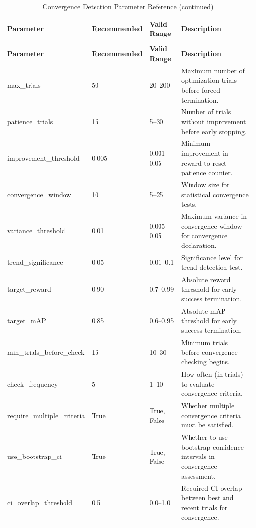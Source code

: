 \begin{longtable}{p{3.5cm}p{2cm}p{2.5cm}p{5.5cm}}
\caption{Convergence Detection Parameter Reference} \label{tab:convergence} \\
\toprule
\textbf{Parameter} & \textbf{Recommended} & \textbf{Valid Range} & \textbf{Description} \\
\midrule
\endfirsthead
\caption[]{Convergence Detection Parameter Reference (continued)} \\
\toprule
\textbf{Parameter} & \textbf{Recommended} & \textbf{Valid Range} & \textbf{Description} \\
\midrule
\endhead
\bottomrule
\endfoot
\bottomrule
\endlastfoot
max\_trials & 50 & 20--200 & Maximum number of optimization trials before forced termination. \\
\addlinespace
patience\_trials & 15 & 5--30 & Number of trials without improvement before early stopping. \\
\addlinespace
improvement\_threshold & 0.005 & 0.001--0.05 & Minimum improvement in reward to reset patience counter. \\
\addlinespace
convergence\_window & 10 & 5--25 & Window size for statistical convergence tests. \\
\addlinespace
variance\_threshold & 0.01 & 0.005--0.05 & Maximum variance in convergence window for convergence declaration. \\
\addlinespace
trend\_significance & 0.05 & 0.01--0.1 & Significance level for trend detection test. \\
\addlinespace
target\_reward & 0.90 & 0.7--0.99 & Absolute reward threshold for early success termination. \\
\addlinespace
target\_mAP & 0.85 & 0.6--0.95 & Absolute mAP threshold for early success termination. \\
\addlinespace
min\_trials\_before\_check & 15 & 10--30 & Minimum trials before convergence checking begins. \\
\addlinespace
check\_frequency & 5 & 1--10 & How often (in trials) to evaluate convergence criteria. \\
\addlinespace
require\_multiple\_criteria & True & True, False & Whether multiple convergence criteria must be satisfied. \\
\addlinespace
use\_bootstrap\_ci & True & True, False & Whether to use bootstrap confidence intervals in convergence assessment. \\
\addlinespace
ci\_overlap\_threshold & 0.5 & 0.0--1.0 & Required CI overlap between best and recent trials for convergence. \\

\end{longtable}
